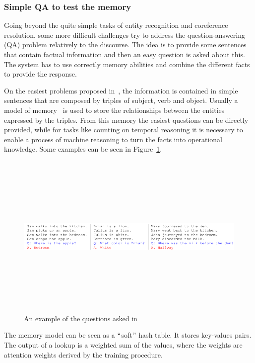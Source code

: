\subsubsection{Simple QA to test the memory}
Going beyond the quite simple tasks of entity recognition and coreference resolution, some more difficult challenges try to address the question-answering (QA) problem relatively to the discourse. The idea is to provide some sentences that contain factual information and then an easy question is asked about this. The system has to use correctly memory abilities and combine the different facts to provide the response.

On the easiest problems proposed in~\cite{weston2015towards}, the information is contained in simple sentences that are composed by triples of subject, verb and object. Usually a model of memory~\cite{sukhbaatar2015end} is used to store the relationships between the entities expressed by the triples. From this memory the easiest questions can be directly provided, while for tasks like counting on temporal reasoning it is necessary to enable a process of machine reasoning to turn the facts into operational knowledge. Some examples can be seen in Figure~\ref{fig:toyQuestionsMemory}.

\begin{figure}[!htbp]
    \centering
    \includegraphics[max width=\linewidth,max height=8cm,keepaspectratio]{figures/toyQuestionsMemory}
    \caption{An example of the questions asked in~\cite{weston2015towards}}\label{fig:toyQuestionsMemory}
\end{figure}

The memory model can be seen as a $``$soft$"$  hash table. It stores key-values pairs. The output of a lookup is a weighted sum of the values, where the weights are attention weights derived by the training procedure.

